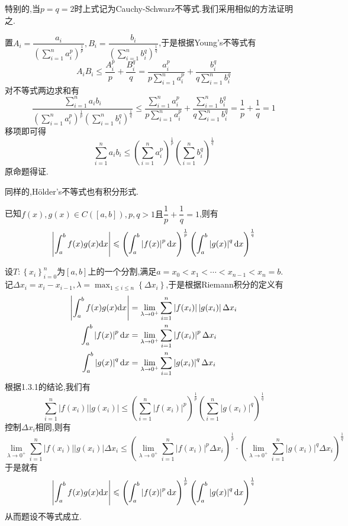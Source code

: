 \documentclass{ctexart}
\begin{document}
特别的,当$p=q=2$时上式记为Cauchy-Schwarz不等式.我们采用相似的方法证明之.
\begin{solution}[Proof.]
    置$A_i=\dfrac{a_i}{\left(\sum_{i=1}^{n}a_i^p\right)^{\frac{1}{p}}},B_i=\dfrac{b_i}{\left(\sum_{i=1}^{n}b_i^q\right)^{\frac{1}{q}}}$,于是根据Young's不等式有
    $$A_iB_i\leqslant\dfrac{A_i^p}{p}+\dfrac{B_i^q}{q}=\dfrac{a_i^p}{p\sum_{i=1}^{n}a_i^p}+\dfrac{b_i^q}{q\sum_{i=1}^{n}b_i^q}$$
    对不等式两边求和有$$\dfrac{\sum_{i=1}^na_ib_i}{\left(\sum_{i=1}^na_i^p\right)^{\frac{1}{p}}\left(\sum_{i=1}^nb_i^q\right)^{\frac{1}{q}}}\leqslant\dfrac{\sum_{i=1}^{n}a_i^p}{p\sum_{i=1}^{n}a_i^p}+\dfrac{\sum_{i=1}^{n}b_i^q}{q\sum_{i=1}^{n}b_i^q}=\dfrac{1}{p}+\dfrac{1}{q}=1$$
    移项即可得$$\sum_{i=1}^{n}a_ib_i\leqslant\left(\sum_{i=1}^{n}a_i^p\right)^{\frac{1}{p}}\left(\sum_{i=1}^{n}b_i^q\right)^{\frac{1}{q}}$$
    原命题得证.
\end{solution}\noindent
同样的,Hölder's不等式也有积分形式.
\begin{formal}
    已知$f(x),g(x)\in C([a,b]),p,q>1\text{且}\dfrac{1}{p}+\dfrac{1}{q}=1$,则有
    $$\left|\int_a^bf(x)g(x)\mathrm{d} x\right|\leqslant\left(\int_a^b\left|f(x)\right|^p\mathrm{d} x\right)^{\frac{1}{p}}\left(\int_a^b\left|g(x)\right|^q\mathrm{d} x\right)^{\frac{1}{q}}$$
\end{formal}
\begin{solution}[Proof.]
    设$T:\left\{x_i\right\}_{i=0}^n$为$[a,b]$上的一个分割,满足$a=x_0<x_1<\cdots<x_{n-1}<x_n=b$.\\
    记$\displaystyle\Delta x_i=x_i-x_{i-1},\lambda=\max_{1\leqslant i\leqslant n}\left\{\Delta x_i\right\}$,于是根据Riemann积分的定义有
    $$\begin{aligned}
        \left|\int_a^bf(x)g(x)\mathrm{d} x\right| &= \lim_{\lambda\to0^+}\sum_{i=1}^{n}\left|f(x_i)\right|\left|g(x_i)\right|\Delta x_i \\
        \int_a^b\left|f(x)\right|^p\mathrm{d} x &= \lim_{\lambda\to0^+}\sum_{i=1}^n\left|f(x_i)\right|^p\Delta x_i \\
        \int_a^b\left|g(x)\right|^q\mathrm{d} x &= \lim_{\lambda\to0^+}\sum_{i=1}^n\left|g(x_i)\right|^q\Delta x_i
    \end{aligned}$$    
    根据1.3.1的结论,我们有
    $$\sum_{i=1}^{n}\left|f(x_i)\right|\left|g(x_i)\right|\leqslant\left(\sum_{i=1}^{n}\left|f(x_i)\right|^p\right)^{\frac{1}{p}}\left(\sum_{i=1}^{n}\left|g(x_i)\right|^q\right)^{\frac{1}{q}}$$
    控制$\Delta x_i$相同,则有
    $$\lim_{\lambda\to0^+}\sum_{i=1}^{n}\left|f(x_i)\right|\left|g(x_i)\right|\Delta x_i\leqslant\left(\lim_{\lambda\to0^+}\sum_{i=1}^n\left|f(x_i)\right|^p\Delta x_i\right)^{\frac{1}{p}}\cdot\left(\lim_{\lambda\to0^+}\sum_{i=1}^n\left|g(x_i)\right|^q\Delta x_i\right)^{\frac{1}{q}}$$
    于是就有
    $$\left|\int_a^bf(x)g(x)\mathrm{d} x\right|\leqslant\left(\int_a^b\left|f(x)\right|^p\mathrm{d} x\right)^{\frac{1}{p}}\left(\int_a^b\left|g(x)\right|^q\mathrm{d} x\right)^{\frac{1}{q}}$$
    从而题设不等式成立.
\end{solution}
\end{document}
